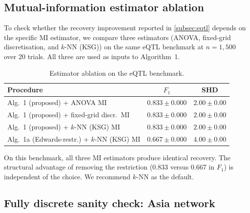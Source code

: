 \subsection{Mutual-information estimator ablation}
\label{subsec:ablation}

To check whether the recovery improvement reported in
\cref{subsec:eqtl} depends on the specific MI estimator, we
compare three estimators (ANOVA, fixed-grid discretisation, and
$k$-NN (KSG)) on the same eQTL benchmark at $n = 1{,}500$ over
20 trials. All three are used as inputs to Algorithm~1.

\begin{table}[ht]
\centering
\caption{Estimator ablation on the eQTL benchmark.}
\label{tab:ablation}
\begin{tabular}{lcc}
\toprule
Procedure & $F_1$ & SHD \\
\midrule
Alg.~1 (proposed) + ANOVA MI               & $0.833 \pm 0.000$ & $2.00 \pm 0.00$ \\
Alg.~1 (proposed) + fixed-grid discr.\ MI  & $0.833 \pm 0.000$ & $2.00 \pm 0.00$ \\
Alg.~1 (proposed) + $k$-NN (KSG) MI        & $0.833 \pm 0.000$ & $2.00 \pm 0.00$ \\
Alg.~1a (Edwards-restr.) + $k$-NN (KSG) MI & $0.667 \pm 0.000$ & $4.00 \pm 0.00$ \\
\bottomrule
\end{tabular}
\end{table}

On this benchmark, all three MI estimators produce identical
recovery. The structural advantage of removing the restriction
(0.833 versus 0.667 in $F_1$) is independent of the choice. We
recommend $k$-NN as the default.

\subsection{Fully discrete sanity check: Asia network}
\label{subsec:asia}

